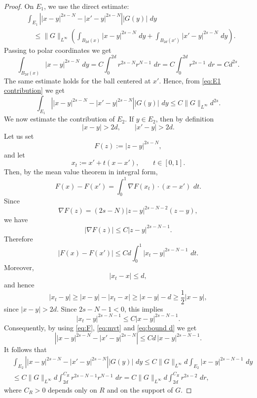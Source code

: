 \documentclass[11pt,a4paper]{article}
\newcommand{\dd}{\,d}
\begin{document}
\begin{proof}
On \(E_1\), we use the direct estimate:
\begin{equation}\label{eq:E1 contribution}
\begin{aligned}
&\int_{E_1}
\left|
|x-y|^{2s-N}-|x'-y|^{2s-N}
\right|
|G(y)|\,\dd y\\
&\quad\le
\|G\|_{L^\infty}
\left(
\int_{B_{2d}(x)} |x-y|^{2s-N}\,\dd y
+
\int_{B_{2d}(x')} |x'-y|^{2s-N}\,\dd y
\right).
\end{aligned}
\end{equation}
Passing to polar coordinates we get
\[
\int_{B_{2d}(x)} |x-y|^{2s-N}\,\dd y
=
C\int_0^{2d} r^{2s-N}r^{N-1}\,\dd r
=
C\int_0^{2d} r^{2s-1}\,\dd r
=
Cd^{2s}.
\]
The same estimate holds for the ball centered at \(x'\). Hence, from \eqref{eq:E1 contribution} we get
\begin{equation}\label{eq:E1}
\int_{E_1}
\left|
|x-y|^{2s-N}-|x'-y|^{2s-N}
\right|
|G(y)|\,\dd y
\le
C\|G\|_{L^\infty}d^{2s}.
\end{equation}
We now estimate the contribution of \(E_2\). If \(y\in E_2\), then by definition
\[
|x-y|>2d,
\qquad
|x'-y|>2d.
\]
Let us set
\begin{equation}\label{eq:F}
F(z):=|z-y|^{2s-N},
\end{equation}
and let
\[
x_t:=x'+t(x-x'),
\qquad t\in[0,1].
\]
Then, by the mean value theorem in integral form,
\begin{equation}\label{eq:mvt}
F(x)-F(x')
=
\int_0^1 \nabla F(x_t)\cdot(x-x')\,\dd t.
\end{equation}
Since
\[
\nabla F(z)
=
(2s-N)|z-y|^{2s-N-2}(z-y),
\]
we have
\[
|\nabla F(z)|
\le
C|z-y|^{2s-N-1}.
\]
Therefore
\begin{equation}\label{eq:bound d}
|F(x)-F(x')|
\le
Cd\int_0^1 |x_t-y|^{2s-N-1}\,\dd t.
\end{equation}
Moreover,
\[
|x_t-x|\le d,
\]
and hence
\[
|x_t-y|
\ge
|x-y|-|x_t-x|
\ge
|x-y|-d
\ge
\frac12|x-y|,
\]
since \(|x-y|>2d\). Since \(2s-N-1<0\), this implies
\[
|x_t-y|^{2s-N-1}
\le
C|x-y|^{2s-N-1}.
\]
Consequently, by using \eqref{eq:F}, \eqref{eq:mvt} and \eqref{eq:bound d} we get
\[
\left|
|x-y|^{2s-N}-|x'-y|^{2s-N}
\right|
\le
Cd\,|x-y|^{2s-N-1}.
\]
It follows that
\begin{equation}\label{eq:bla}
\begin{aligned}
&\int_{E_2}
\left|
|x-y|^{2s-N}-|x'-y|^{2s-N}
\right|
|G(y)|\,\dd y
\le
C\|G\|_{L^\infty}d
\int_{E_2}|x-y|^{2s-N-1}\,\dd y\\
&\le
C\|G\|_{L^\infty}d
\int_{2d}^{C_R} r^{2s-N-1}r^{N-1}\,\dd r =
C\|G\|_{L^\infty}d
\int_{2d}^{C_R} r^{2s-2}\,\dd r,
\end{aligned}
\end{equation}
where \(C_R>0\) depends only on \(R\) and on the support of \(G\).


\end{proof}
\end{document}
